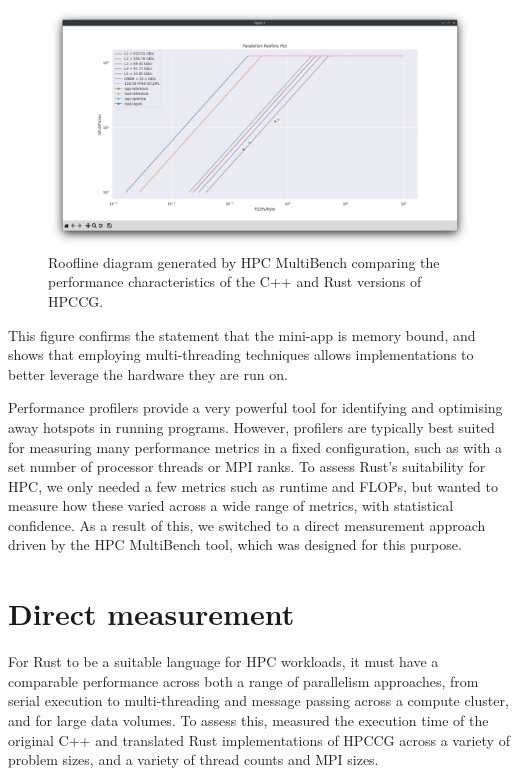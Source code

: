 \begin{figure}[H]
    \centering
    \includegraphics[width=\textwidth]{images/4_tooling/interactive_screenshots/hpc-multibench-roofline-matplotlib.png}
    \caption{Roofline diagram generated by HPC MultiBench comparing the performance characteristics of the C++ and Rust versions of HPCCG.}
    \label{fig:hpc-multibench-roofline}
\end{figure}

This figure confirms the statement that the \acrshort{mini-app} is memory bound, and shows that employing multi-threading techniques allows implementations to better leverage the hardware they are run on.

Performance profilers provide a very powerful tool for identifying and optimising away hotspots in running programs. However, profilers are typically best suited for measuring many performance metrics in a fixed configuration, such as with a set number of processor threads or MPI ranks. To assess Rust's suitability for \acrshort{HPC}, we only needed a few metrics such as runtime and \acrshort{FLOPs}, but wanted to measure how these varied across a wide range of metrics, with statistical confidence. As a result of this, we switched to a direct measurement approach driven by the HPC MultiBench tool, which was designed for this purpose.

\section{Direct measurement}
\label{sec:direct-measurement}

For Rust to be a suitable language for \acrshort{HPC} workloads, it must have a comparable performance across both a range of parallelism approaches, from serial execution to multi-threading and message passing across a compute cluster, and for large data volumes. To assess this, measured the execution time of the original C++ and translated Rust implementations of HPCCG across a variety of problem sizes, and a variety of thread counts and MPI sizes.

